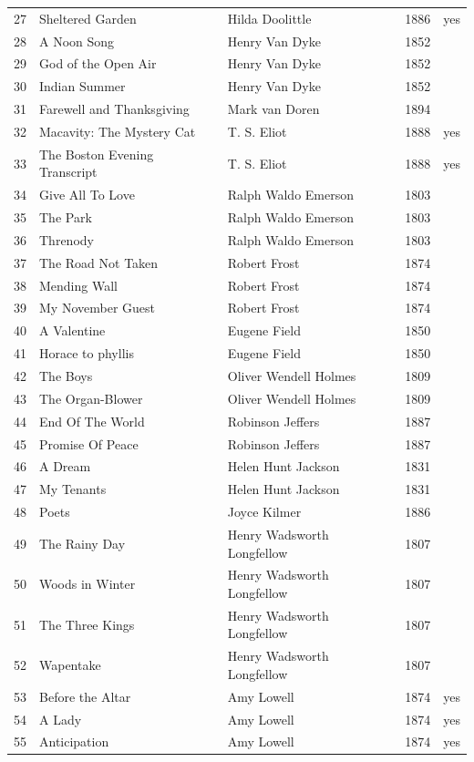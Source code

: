 \documentclass{book}
\begin{document}
\begin{table}[h!]
\begin{tabular}{lllll}
27 & Sheltered Garden & Hilda Doolittle & 1886 & yes \\
28 & A Noon Song & Henry Van Dyke & 1852 \\
29 & God of the Open Air & Henry Van Dyke & 1852 \\
30 & Indian Summer & Henry Van Dyke & 1852 \\
31 & Farewell and Thanksgiving & Mark van Doren & 1894 \\
32 & Macavity: The Mystery Cat & T. S. Eliot & 1888 & yes \\
33 & The Boston Evening Transcript & T. S. Eliot & 1888 & yes \\
34 & Give All To Love & Ralph Waldo Emerson & 1803 \\
35 & The Park & Ralph Waldo Emerson & 1803 \\
36 & Threnody & Ralph Waldo Emerson & 1803 \\
37 & The Road Not Taken & Robert Frost & 1874 \\
38 & Mending Wall & Robert Frost & 1874 \\
39 & My November Guest & Robert Frost & 1874 \\
40 & A Valentine & Eugene Field & 1850 \\
41 & Horace to phyllis & Eugene Field & 1850 \\
42 & The Boys & Oliver Wendell Holmes & 1809 \\
43 & The Organ-Blower & Oliver Wendell Holmes & 1809 \\
44 & End Of The World & Robinson Jeffers & 1887 \\
45 & Promise Of Peace & Robinson Jeffers & 1887 \\
46 & A Dream & Helen Hunt Jackson & 1831 \\
47 & My Tenants & Helen Hunt Jackson & 1831 \\
48 & Poets & Joyce Kilmer & 1886 \\
49 & The Rainy Day & Henry Wadsworth Longfellow & 1807 \\
50 & Woods in Winter & Henry Wadsworth Longfellow & 1807 \\
51 & The Three Kings & Henry Wadsworth Longfellow & 1807 \\
52 & Wapentake & Henry Wadsworth Longfellow & 1807 \\
53 & Before the Altar & Amy Lowell & 1874 & yes \\
54 & A Lady & Amy Lowell & 1874 & yes \\
55 & Anticipation & Amy Lowell & 1874 & yes \\

\end{tabular}
\end{table}
\end{document}
